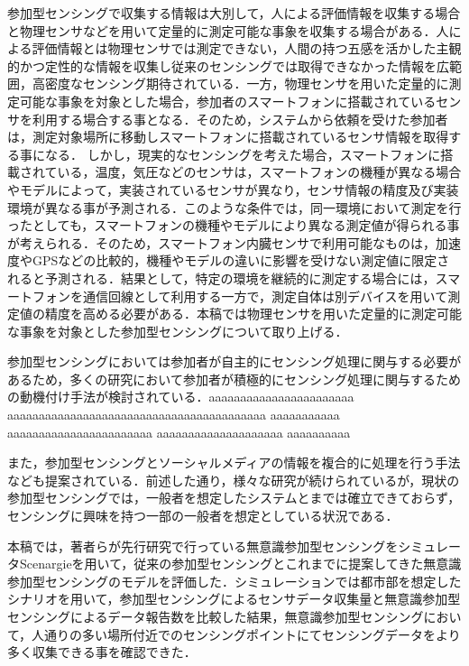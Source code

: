 \documentclass[submit,techrep]{ipsj}
\begin{document}
参加型センシングで収集する情報は大別して，人による評価情報を収集する場合\cite{Lam}と物理センサなどを用いて定量的に測定可能な事象を収集する場合\cite{Shinohara}がある．人による評価情報とは物理センサでは測定できない，人間の持つ五感を活かした主観的かつ定性的な情報を収集し従来のセンシングでは取得できなかった情報を広範囲，高密度なセンシング期待されている．一方，物理センサを用いた定量的に測定可能な事象を対象とした場合，参加者のスマートフォンに搭載されているセンサを利用する場合する事となる．そのため，システムから依頼を受けた参加者は，測定対象場所に移動しスマートフォンに搭載されているセンサ情報を取得する事になる．
しかし，現実的なセンシングを考えた場合，スマートフォンに搭載されている，温度，気圧などのセンサは，スマートフォンの機種が異なる場合やモデルによって，実装されているセンサが異なり，センサ情報の精度及び実装環境が異なる事が予測される．このような条件では，同一環境において測定を行ったとしても，スマートフォンの機種やモデルにより異なる測定値が得られる事が考えられる．そのため，スマートフォン内臓センサで利用可能なものは，加速度やGPSなどの比較的，機種やモデルの違いに影響を受けない測定値に限定されると予測される．結果として，特定の環境を継続的に測定する場合には，スマートフォンを通信回線として利用する一方で，測定自体は別デバイスを用いて測定値の精度を高める必要がある\cite{Li}．本稿では物理センサを用いた定量的に測定可能な事象を対象とした参加型センシングについて取り上げる．


参加型センシングにおいては参加者が自主的にセンシング処理に関与する必要があるため，多くの研究において参加者が積極的にセンシング処理に関与するための動機付け手法が検討されている\cite{Yoshitaka}．aaaaaaaaaaaaaaaaaaaaaaa
aaaaaaaaaaaaaaaaaaaaaaaaaaaaaaaaaaaaaaaaa
aaaaaaaaaaa aaaaaaaaaaaaaaaaaaaaaaa  aaaaaaaaaaaaaaaaaaaa aaaaaaaaaa


また，参加型センシングとソーシャルメディアの情報を複合的に処理を行う手法なども提案されている\cite{Demirbas}．前述した通り，様々な研究が続けられているが，現状の参加型センシングでは，一般者を想定したシステムとまでは確立できておらず，センシングに興味を持つ一部の一般者を想定としている状況である．

本稿では，著者らが先行研究\cite{Mizukami}で行っている無意識参加型センシングをシミュレータScenargie\cite{Scenargie}を用いて，従来の参加型センシングとこれまでに提案してきた無意識参加型センシングのモデルを評価した．シミュレーションでは都市部を想定したシナリオを用いて，参加型センシングによるセンサデータ収集量と無意識参加型センシングによるデータ報告数を比較した結果，無意識参加型センシングにおいて，人通りの多い場所付近でのセンシングポイントにてセンシングデータをより多く収集できる事を確認できた．
\end{document}
